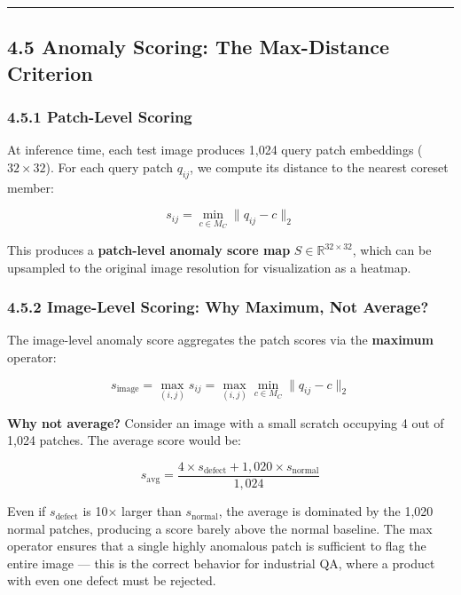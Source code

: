 \begin{center}\rule{0.5\linewidth}{0.5pt}\end{center}

\subsection{4.5 Anomaly Scoring: The Max-Distance Criterion}\label{anomaly-scoring-the-max-distance-criterion}

\subsubsection{4.5.1 Patch-Level Scoring}\label{patch-level-scoring}

At inference time, each test image produces 1,024 query patch embeddings (\(32 \times 32\)). For each query patch \(q_{ij}\), we compute its distance to the nearest coreset member:

\[s_{ij} = \min_{c \in M_C} \|q_{ij} - c\|_2\]

This produces a \textbf{patch-level anomaly score map} \(S \in \mathbb{R}^{32 \times 32}\), which can be upsampled to the original image resolution for visualization as a heatmap.

\subsubsection{4.5.2 Image-Level Scoring: Why Maximum, Not Average?}\label{image-level-scoring-why-maximum-not-average}

The image-level anomaly score aggregates the patch scores via the \textbf{maximum} operator:

\[s_{\text{image}} = \max_{(i,j)} s_{ij} = \max_{(i,j)} \min_{c \in M_C} \|q_{ij} - c\|_2\]

\textbf{Why not average?} Consider an image with a small scratch occupying 4 out of 1,024 patches. The average score would be:

\[s_{\text{avg}} = \frac{4 \times s_{\text{defect}} + 1{,}020 \times s_{\text{normal}}}{1{,}024}\]

Even if \(s_{\text{defect}}\) is 10× larger than \(s_{\text{normal}}\), the average is dominated by the 1,020 normal patches, producing a score barely above the normal baseline. The max operator ensures that a single highly anomalous patch is sufficient to flag the entire image --- this is the correct behavior for industrial QA, where a product with even one defect must be rejected.

